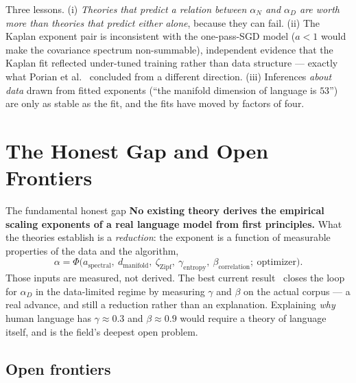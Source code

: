 \documentclass[11pt,a4paper]{article}
\theoremstyle{definition}
\begin{document}
Three lessons. (i) \emph{Theories that predict a relation between $\alpha_N$ and $\alpha_D$ are worth more than theories that predict either alone}, because they can fail. (ii) The Kaplan exponent pair is inconsistent with the one-pass-SGD model ($a<1$ would make the covariance spectrum non-summable), independent evidence that the Kaplan fit reflected under-tuned training rather than data structure --- exactly what Porian et al.~\cite{porian2024resolving} concluded from a different direction. (iii) Inferences \emph{about data} drawn from fitted exponents (``the manifold dimension of language is $53$'') are only as stable as the fit, and the fits have moved by factors of four.

\section{The Honest Gap and Open Frontiers}
\label{sec:open_challenges}

\begin{caution}{The fundamental honest gap}
\textbf{No existing theory derives the empirical scaling exponents of a real language model from first principles.} What the theories establish is a \emph{reduction}: the exponent is a function of measurable properties of the data and the algorithm,
\begin{equation}
  \alpha = \Phi\big(a_{\mathrm{spectral}},\ d_{\mathrm{manifold}},\ \zeta_{\mathrm{Zipf}},\ \gamma_{\mathrm{entropy}},\ \beta_{\mathrm{correlation}};\ \text{optimizer}\big) .
\end{equation}
Those inputs are measured, not derived. The best current result~\cite{cagnetta2026deriving} closes the loop for $\alpha_D$ in the data-limited regime by measuring $\gamma$ and $\beta$ on the actual corpus --- a real advance, and still a reduction rather than an explanation. Explaining \emph{why} human language has $\gamma\approx 0.3$ and $\beta\approx 0.9$ would require a theory of language itself, and is the field's deepest open problem.
\end{caution}

\subsection{Open frontiers}
\end{document}
